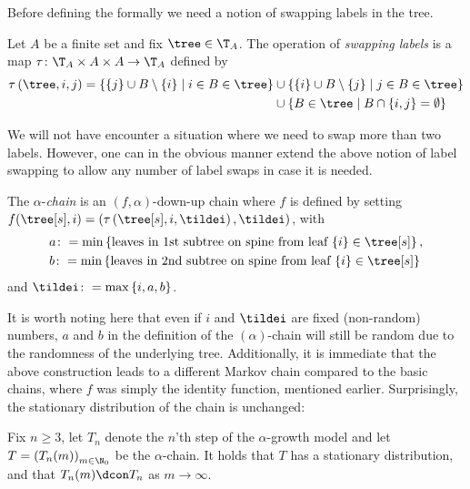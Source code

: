 Before defining the formally we need a notion of swapping labels in the tree.
%
\begin{defi}
  Let $A$ be a finite set and fix $\tree \in \T_A$.
  The operation of \textit{swapping labels} is a map $\tau \colon \T_A \times A \times A \to \T_A$ defined by
  \begin{align*}
    \tau\left( \tree, i, j \right)
    = \left\{ \{j\} \cup B \setminus \{i\} \mid i \in B \in \tree \right\}
    &\cup \left\{ \{i\} \cup B \setminus \{j\} \mid j \in B \in \tree \right\} \\
    &\cup \left\{ B \in \tree \mid B \cap \{i, j\} = \emptyset \right\}
  \end{align*}
\end{defi}
%
We will not have encounter a situation where we need to swap more than two labels.
However, one can in the obvious manner extend the above notion of label swapping to allow any number of label swaps in case it is needed.
%
\begin{defi}\label{alphachain}
  The $\alpha$-\textit{chain} is an $(f,\alpha)$-down-up chain where $f$ is defined by setting $f(\tree[s], i) = \left(\tau\left( \tree[s], i, \tildei \right), \tildei \right)$, with
  \begin{align}\label{eq:ab_def}
      &a \colon = \min \left\{ \text{leaves in 1st subtree on spine from leaf}\ \{i\} \in \tree[s] \right\}, \\
      &b \colon = \min \left\{ \text{leaves in 2nd subtree on spine from leaf}\ \{i\} \in \tree[s] \right\}
  \end{align}
  and $\tildei \colon = \max\left\{ i, a, b \right\}$.
  \end{defi}
%
It is worth noting here that even if $i$ and $\tildei$ are fixed (non-random) numbers, $a$ and $b$ in the definition of the $(\alpha)$-chain will still be random due to the randomness of the underlying tree.
Additionally, it is immediate that the above construction leads to a different Markov chain compared to the basic chains, where $f$ was simply the identity function, mentioned earlier.
Surprisingly, the stationary distribution of the chain is unchanged:
%
\begin{thm}\label{StatDistBin}
  Fix $n \geq 3$, let $T_n$ denote the $n$'th step of the $\alpha$-growth model and let $T = {\left( T_n(m) \right)}_{m \in \N_0}$ be the $\alpha$-chain.
  It holds that $T$ has a stationary distribution, and that $T_n(m) \dcon T_n$ as $m \to \infty$.
\end{thm}
